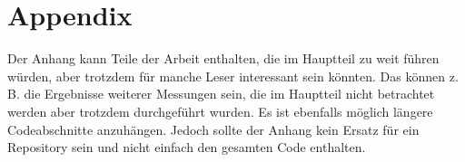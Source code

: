 \chapter{Appendix}
Der Anhang kann Teile der Arbeit enthalten, die im Hauptteil zu weit führen würden, aber trotzdem für manche Leser interessant sein könnten. Das können z.\,B. die Ergebnisse weiterer Messungen sein, die im Hauptteil nicht betrachtet werden aber trotzdem durchgeführt wurden. Es ist ebenfalls möglich längere Codeabschnitte anzuhängen. Jedoch sollte der Anhang kein Ersatz für ein Repository sein und nicht einfach den gesamten Code enthalten.